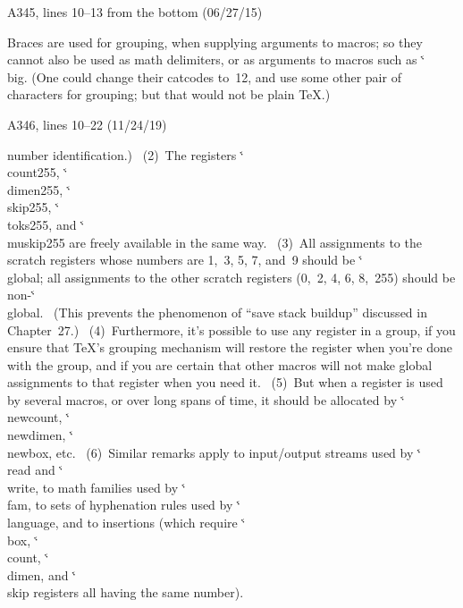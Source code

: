 \bugonpage A345, lines 10--13 from the bottom (06/27/15)

\ninepoint\noindent
Braces are used for grouping, when supplying
arguments to macros; so they cannot also be used as math delimiters, or as
arguments to macros such as \.{\char`\\big}. (One could change their catcodes
to~12, and use some other pair of characters for grouping; but that
would not be plain \TeX.)

\bugonpage A346, lines 10--22 (11/24/19)

\ninepoint\noindent
number identification.) \ (2)~The registers
\.{\char`\\count255}, \.{\char`\\dimen255}, \.{\char`\\skip255},
\.{\char`\\toks255}, and \.{\char`\\muskip255}
are freely available in the same way.
\ (3)~All assignments to the scratch registers whose numbers are
1,~3, 5, 7, and~9 should be \.{\char`\\global}; all assignments to the
other scratch registers (0,~2, 4, 6, 8,~255) should be non-\.{\char`\\global}.
\ (This prevents the phenomenon of ``save stack buildup'' discussed
in Chapter~27.)
\ (4)~Furthermore, it's possible to
use any register in a group, if you ensure that \TeX's grouping
mechanism will restore the register when you're done with the group, and
if you are certain that other macros will not make global assignments
to that register when you need it. \ (5)~But when a register is used
by several macros, or over long spans of time, it should be allocated
by \.{\char`\\newcount}, \.{\char`\\newdimen}, \.{\char`\\newbox},
etc. \ (6)~Similar remarks
apply to input/output streams used by \.{\char`\\read} and \.{\char`\\write},
to math families used by \.{\char`\\fam}, to sets of hyphenation rules used by
\.{\char`\\language}, and to insertions (which require
\.{\char`\\box}, \.{\char`\\count}, \.{\char`\\dimen},
and \.{\char`\\skip} registers all having the
same number).

